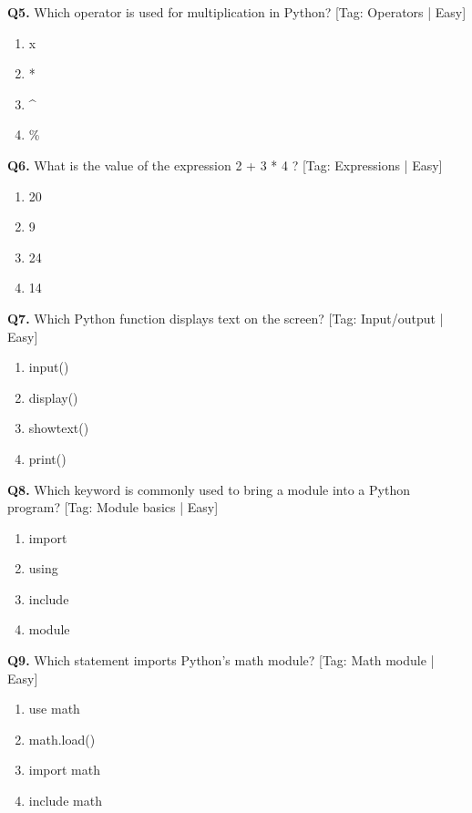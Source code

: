 \vspace{2mm}
\noindent\textbf{Q5.} Which operator is used for multiplication in Python? \hfill [Tag: Operators | Easy]
\begin{enumerate}[label=(\alph*),topsep=2pt,itemsep=1pt,partopsep=0pt,parsep=0pt]
    \item {x}
    \item {*}
    \item {\textasciicircum{}}
    \item {\%}
\end{enumerate}
\vspace{2mm}
\noindent\textbf{Q6.} What is the value of the expression 2 + 3 * 4 ? \hfill [Tag: Expressions | Easy]
\begin{enumerate}[label=(\alph*),topsep=2pt,itemsep=1pt,partopsep=0pt,parsep=0pt]
    \item {20}
    \item {9}
    \item {24}
    \item {14}
\end{enumerate}
\vspace{2mm}
\noindent\textbf{Q7.} Which Python function displays text on the screen? \hfill [Tag: Input/output | Easy]
\begin{enumerate}[label=(\alph*),topsep=2pt,itemsep=1pt,partopsep=0pt,parsep=0pt]
    \item {input()}
    \item {display()}
    \item {showtext()}
    \item {print()}
\end{enumerate}
\vspace{2mm}
\noindent\textbf{Q8.} Which keyword is commonly used to bring a module into a Python program? \hfill [Tag: Module basics | Easy]
\begin{enumerate}[label=(\alph*),topsep=2pt,itemsep=1pt,partopsep=0pt,parsep=0pt]
    \item {import}
    \item {using}
    \item {include}
    \item {module}
\end{enumerate}
\vspace{2mm}
\noindent\textbf{Q9.} Which statement imports Python's math module? \hfill [Tag: Math module | Easy]
\begin{enumerate}[label=(\alph*),topsep=2pt,itemsep=1pt,partopsep=0pt,parsep=0pt]
    \item {use math}
    \item {math.load()}
    \item {import math}
    \item {include math}
\end{enumerate}
